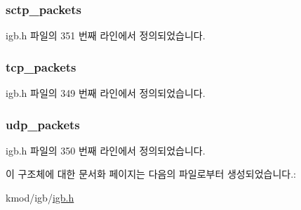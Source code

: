 \subsubsection[{\texorpdfstring{sctp\+\_\+packets}{sctp_packets}}]{ sctp\+\_\+packets}\hypertarget{structigb__rx__packet__stats_add2d5545573762497be65a5a43de54c5}{}\label{structigb__rx__packet__stats_add2d5545573762497be65a5a43de54c5}


igb.\+h 파일의 351 번째 라인에서 정의되었습니다.

\subsubsection[{\texorpdfstring{tcp\+\_\+packets}{tcp_packets}}]{ tcp\+\_\+packets}\hypertarget{structigb__rx__packet__stats_a51215069637ad3df438914021f4ee4c3}{}\label{structigb__rx__packet__stats_a51215069637ad3df438914021f4ee4c3}


igb.\+h 파일의 349 번째 라인에서 정의되었습니다.

\subsubsection[{\texorpdfstring{udp\+\_\+packets}{udp_packets}}]{ udp\+\_\+packets}\hypertarget{structigb__rx__packet__stats_a28e2e368567f7430ad6aea43652578ef}{}\label{structigb__rx__packet__stats_a28e2e368567f7430ad6aea43652578ef}


igb.\+h 파일의 350 번째 라인에서 정의되었습니다.



이 구조체에 대한 문서화 페이지는 다음의 파일로부터 생성되었습니다.\+:\begin{DoxyCompactItemize}
\item 
kmod/igb/\hyperlink{kmod_2igb_2igb_8h}{igb.\+h}\end{DoxyCompactItemize}
